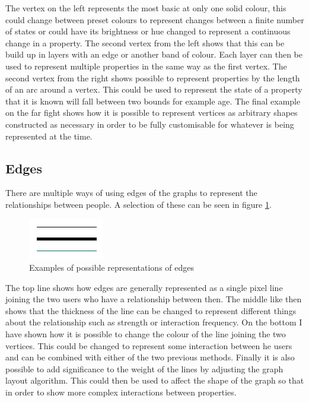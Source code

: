 \documentclass[12pt,a4paper]{article}
\begin{document}
The vertex on the left represents the most basic at only one solid colour, this could change between preset colours to represent changes between a finite number of states or could have its brightness or hue changed to represent a continuous change in a property.
The second vertex from the left shows that this can be build up in layers with an edge or another band of colour. Each layer can then be used to represent multiple properties in the same way as the first vertex.
The second vertex from the right shows possible to represent properties by the length of an arc around a vertex. This could be used to represent the state of a property that it is known will fall between two bounds for example age.
The final example on the far fight shows how it is possible to represent vertices as arbitrary shapes constructed as necessary in order to be fully customisable for whatever is being represented at the time.

\subsection{Edges}
\noindent
There are multiple ways of using edges of the graphs to represent the relationships between people. A selection of these can be seen in figure \ref{fig:edges}.

\begin{figure}[htb]
\caption{Examples of possible representations of edges}
\label{fig:edges}
\centering
\includegraphics[scale=0.7]{Edges.png}
\end{figure}

The top line shows how edges are generally represented as a single pixel line joining the two users who have a relationship between then.
The middle like then shows that the thickness of the line can be changed to represent different things about the relationship such as strength or interaction frequency. On the bottom I have shown how it is possible to change the colour of the line joining the two vertices. This could be changed to represent some interaction between he users and can be combined with either of the two previous methods. Finally it is also possible to add significance to the weight of the lines by adjusting the graph layout algorithm. This could then be used to affect the shape of the graph so that in order to show more complex interactions between properties.
\end{document}
